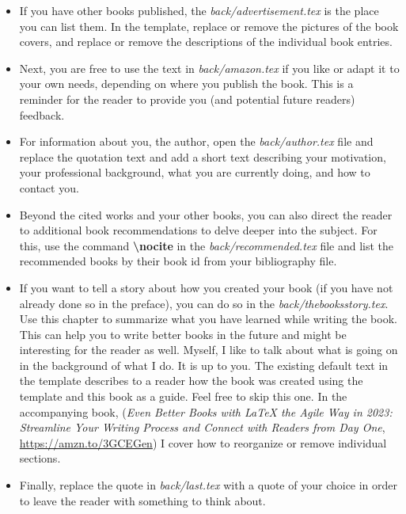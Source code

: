 \begin{itemize}

\item If you have other books published, the \textit{back/advertisement.tex} is the place you can list them. In the template, replace or remove the pictures of the book covers, and replace or remove the descriptions of the individual book entries.

\item Next, you are free to use the text in \textit{back/amazon.tex} if you like or adapt it to your own needs, depending on where you publish the book. This is a reminder for the reader to provide you (and potential future readers) feedback.

\item For information about you, the author, open the \textit{back/author.tex} file and replace the quotation text and add a short text describing your motivation, your professional background, what you are currently doing, and how to contact you.

\item Beyond the cited works and your other books, you can also direct the reader to additional book recommendations to delve deeper into the subject. For this, use the command \textbf{\textbackslash nocite} in the \textit{back/recommended.tex} file and list the recommended books by their book id from your bibliography file.

\item If you want to tell a story about how you created your book (if you have not already done so in the preface), you can do so in the \textit{back/thebooksstory.tex}. Use this chapter to summarize what you have learned while writing the book. This can help you to write better books in the future and might be interesting for the reader as well. Myself, I like to talk about what is going on in the background of what I do. It is up to you. The existing default text in the template describes to a reader how the book was created using the template and this book as a guide. Feel free to skip this one. In the accompanying book, (\textit{Even Better Books with LaTeX the Agile Way in 2023: Streamline Your Writing Process and Connect with Readers from Day One}, \url{https://amzn.to/3GCEGen}) I cover how to reorganize or remove individual sections.

\item Finally, replace the quote in \textit{back/last.tex} with a quote of your choice in order to leave the reader with something to think about.

\end{itemize}

